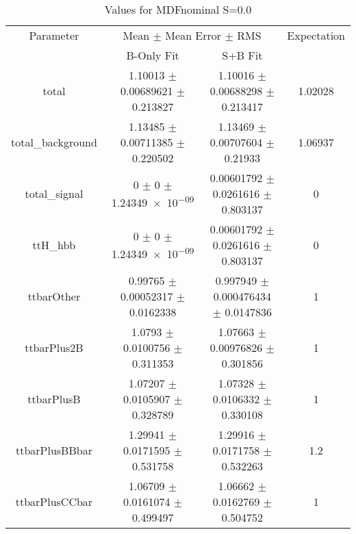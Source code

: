 \begin{table}
\centering
\caption{Values for MDFnominal S=0.0}
\begin{tabular}{cccc}
\toprule
Parameter & \multicolumn{2}{c}{Mean $\pm$ Mean Error $\pm$ RMS} & Expectation\\
 & B-Only Fit & S+B Fit & \\
\midrule
total & \num{1.10013} $\pm$ \num{0.00689621} $\pm$ \num{0.213827} & \num{1.10016} $\pm$ \num{0.00688298} $\pm$ \num{0.213417} & \num{1.02028}\\
total\_background & \num{1.13485} $\pm$ \num{0.00711385} $\pm$ \num{0.220502} & \num{1.13469} $\pm$ \num{0.00707604} $\pm$ \num{0.21933} & \num{1.06937}\\
total\_signal & \num{0} $\pm$ \num{0} $\pm$ \num{1.24349e-09} & \num{0.00601792} $\pm$ \num{0.0261616} $\pm$ \num{0.803137} & \num{0}\\
ttH\_hbb & \num{0} $\pm$ \num{0} $\pm$ \num{1.24349e-09} & \num{0.00601792} $\pm$ \num{0.0261616} $\pm$ \num{0.803137} & \num{0}\\
ttbarOther & \num{0.99765} $\pm$ \num{0.00052317} $\pm$ \num{0.0162338} & \num{0.997949} $\pm$ \num{0.000476434} $\pm$ \num{0.0147836} & \num{1}\\
ttbarPlus2B & \num{1.0793} $\pm$ \num{0.0100756} $\pm$ \num{0.311353} & \num{1.07663} $\pm$ \num{0.00976826} $\pm$ \num{0.301856} & \num{1}\\
ttbarPlusB & \num{1.07207} $\pm$ \num{0.0105907} $\pm$ \num{0.328789} & \num{1.07328} $\pm$ \num{0.0106332} $\pm$ \num{0.330108} & \num{1}\\
ttbarPlusBBbar & \num{1.29941} $\pm$ \num{0.0171595} $\pm$ \num{0.531758} & \num{1.29916} $\pm$ \num{0.0171758} $\pm$ \num{0.532263} & \num{1.2}\\
ttbarPlusCCbar & \num{1.06709} $\pm$ \num{0.0161074} $\pm$ \num{0.499497} & \num{1.06662} $\pm$ \num{0.0162769} $\pm$ \num{0.504752} & \num{1}\\
\bottomrule
\end{tabular}
\end{table}